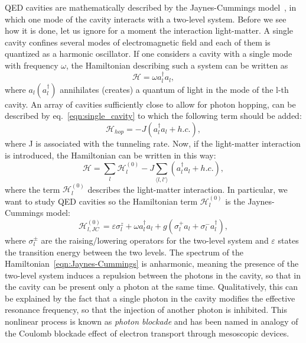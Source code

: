 QED cavities are mathematically described by the Jaynes-Cummings model~\cite{shore_knight}, in which one mode of the cavity interacts with a two-level system. Before we see how it is done, let us ignore for a moment the interaction light-matter. A single cavity confines several modes of electromagnetic field and each of them is quantized as a harmonic oscillator. If one considers a cavity with a single mode with frequency $\omega$, the Hamiltonian describing such a system can be written as
\begin{equation}
\label{eqn:single_cavity}
    \mathcal{H} = \omega a^{\dagger}_la_l,
\end{equation}
where $a_l (a_l^{\dagger})$ annihilates (creates) a quantum of light in the mode of the l-th cavity.
An array of cavities sufficiently close to allow for photon hopping, can be described by eq.~\ref{eqn:single_cavity} to which the following term should be added:
\begin{equation*}
    \mathcal{H}_{hop} = -J (a^{\dagger}_la_l + h.c.),
\end{equation*}
where J is associated with the tunneling rate.
Now, if the light-matter interaction is introduced, the Hamiltonian can be written in this way:
\begin{equation}
    \mathcal{H} = \sum_l \mathcal{H}_l^{(0)} - J \sum_{\langle l, l' \rangle}(a^{\dagger}_la_l + h.c.),
\end{equation}
where the term $\mathcal{H}_l^{(0)}$ describes the light-matter interaction. In particular, we want to study QED cavities so the Hamiltonian term $\mathcal{H}_l^{(0)}$ is the Jaynes-Cummings model:
\begin{equation}
\label{eqn:Jaynes-Cummings}
    \mathcal{H}_{l,JC}^{(0)} = \varepsilon \sigma^z_l + \omega a^{\dagger}_la_l + g(\sigma^+_l a_l + \sigma^-_l a_l^{\dagger}),
\end{equation}
where $\sigma^\pm_l$ are the raising/lowering operators for the two-level system and $\varepsilon$ states the transition energy between the two levels.
The spectrum of the Hamiltonian~\ref{eqn:Jaynes-Cummings} is anharmonic, meaning the presence of the two-level system induces a repulsion between the photons in the cavity, so that in the cavity can be present only a photon at the same time. Qualitatively, this can be explained by the fact that a single photon in the cavity modifies the effective resonance frequency, so that the injection of another photon is inhibited. This nonlinear process is known as \emph{photon blockade} and has been named in analogy of the Coulomb blockade effect of electron transport through mesoscopic devices.

